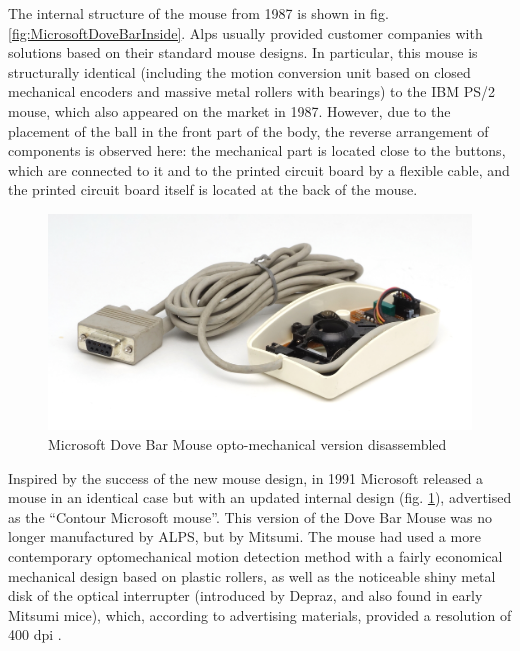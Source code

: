 \documentclass[11pt, a4paper]{article}
\begin{document}
The internal structure of the mouse from 1987 is shown in fig. \ref{fig:MicrosoftDoveBarInside}. Alps usually provided customer companies with solutions based on their standard mouse designs. In particular, this mouse is structurally identical (including the motion conversion unit based on closed mechanical encoders and massive metal rollers with bearings) to the IBM PS/2 mouse, which also appeared on the market in 1987. However, due to the placement of the ball in the front part of the body, the reverse arrangement of components is observed here: the mechanical part is located close to the buttons, which are connected to it and to the printed circuit board by a flexible cable, and the printed circuit board itself is located at the back of the mouse.

\begin{figure}[h]
    \centering
    \includegraphics[scale=0.6]{1987_microsoft_dove_bar_mouse/inside2_60.jpg}
    \caption{Microsoft Dove Bar Mouse opto-mechanical version disassembled}
    \label{fig:MicrosoftDoveBarInside2}
\end{figure}

Inspired by the success of the new mouse design, in 1991 Microsoft released a mouse in an identical case but with an updated internal design (fig. \ref{fig:MicrosoftDoveBarInside2}), advertised as the ``Contour Microsoft mouse''. This version of the Dove Bar Mouse was no longer manufactured by ALPS, but by Mitsumi. The mouse had used a more contemporary optomechanical motion detection method with a fairly economical mechanical design based on plastic rollers, as well as the noticeable shiny metal disk of the optical interrupter (introduced by Depraz, and also found in early Mitsumi mice), which, according to advertising materials, provided a resolution of 400 dpi \cite{doveBarMouseOldMouses}.
\end{document}
